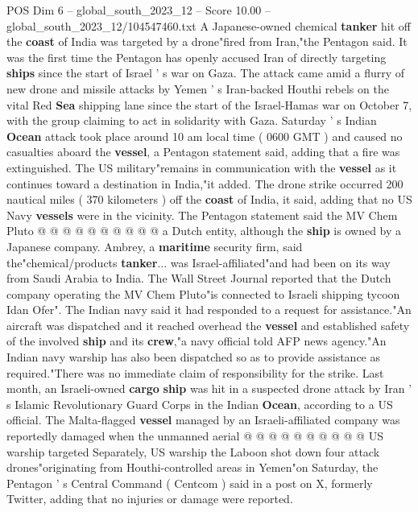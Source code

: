 \begin{textsample}{POS Dim 6 – global\_south\_2023\_12 – Score 10.00 – global\_south\_2023\_12/104547460.txt}  \label{ex:f6_pos_105}
A Japanese-owned chemical \textbf{tanker} hit off the \textbf{coast} of India was targeted by a drone"fired from Iran,"the Pentagon said.
It was the first time the Pentagon has openly accused Iran of directly targeting \textbf{ships} since the start of Israel ' s war on Gaza.
The attack came amid a flurry of new drone and missile attacks by Yemen ' s Iran-backed Houthi rebels on the vital Red \textbf{Sea} shipping lane since the start of the Israel-Hamas war on October 7, with the group claiming to act in solidarity with Gaza.
Saturday ' s Indian \textbf{Ocean} attack took place around 10 am local time ( 0600 GMT ) and caused no casualties aboard the \textbf{vessel}, a Pentagon statement said, adding that a fire was extinguished.
The US military"remains in communication with the \textbf{vessel} as it continues toward a destination in India,"it added.
The drone strike occurred 200 nautical miles ( 370 kilometers ) off the \textbf{coast} of India, it said, adding that no US Navy \textbf{vessels} were in the vicinity.
The Pentagon statement said the MV Chem Pluto @ @ @ @ @ @ @ @ @ @ a Dutch entity, although the \textbf{ship} is owned by a Japanese company.
Ambrey, a \textbf{maritime} security firm, said the"chemical/products \textbf{tanker}... was Israel-affiliated"and had been on its way from Saudi Arabia to India.
The Wall Street Journal reported that the Dutch company operating the MV Chem Pluto"is connected to Israeli shipping tycoon Idan Ofer".
The Indian navy said it had responded to a request for assistance."An aircraft was dispatched and it reached overhead the \textbf{vessel} and established safety of the involved \textbf{ship} and its \textbf{crew},"a navy official told AFP news agency."An Indian navy warship has also been dispatched so as to provide assistance as required."There was no immediate claim of responsibility for the strike.
Last month, an Israeli-owned \textbf{cargo} \textbf{ship} was hit in a suspected drone attack by Iran ' s Islamic Revolutionary Guard Corps in the Indian \textbf{Ocean}, according to a US official.
The Malta-flagged \textbf{vessel} managed by an Israeli-affiliated company was reportedly damaged when the unmanned aerial @ @ @ @ @ @ @ @ @ @ US warship targeted Separately, US warship the Laboon shot down four attack drones"originating from Houthi-controlled areas in Yemen"on Saturday, the Pentagon ' s Central Command ( Centcom ) said in a post on X, formerly Twitter, adding that no injuries or damage were reported.

\end{textsample}
